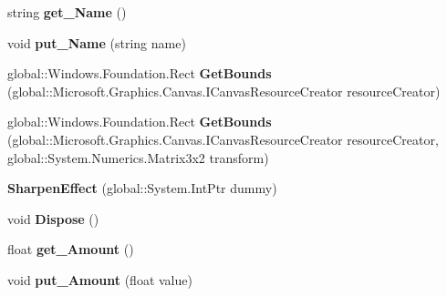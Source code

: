 \begin{DoxyCompactItemize}
string {\bfseries get\+\_\+\+Name} ()
\item 
\mbox{\label{class_microsoft_1_1_graphics_1_1_canvas_1_1_effects_1_1_sharpen_effect_a4cd2933eb68733eaaa81fa49f9170a5f}} 
void {\bfseries put\+\_\+\+Name} (string name)
\item 
\mbox{\label{class_microsoft_1_1_graphics_1_1_canvas_1_1_effects_1_1_sharpen_effect_a79a03d434e2e48956d003964879ce65c}} 
global\+::\+Windows.\+Foundation.\+Rect {\bfseries Get\+Bounds} (global\+::\+Microsoft.\+Graphics.\+Canvas.\+I\+Canvas\+Resource\+Creator resource\+Creator)
\item 
\mbox{\label{class_microsoft_1_1_graphics_1_1_canvas_1_1_effects_1_1_sharpen_effect_a54df6548305c2f7ddeba7230f7fff008}} 
global\+::\+Windows.\+Foundation.\+Rect {\bfseries Get\+Bounds} (global\+::\+Microsoft.\+Graphics.\+Canvas.\+I\+Canvas\+Resource\+Creator resource\+Creator, global\+::\+System.\+Numerics.\+Matrix3x2 transform)
\item 
\mbox{\label{class_microsoft_1_1_graphics_1_1_canvas_1_1_effects_1_1_sharpen_effect_aa2c447cd17b2262cd288cbd0ecd66538}} 
{\bfseries Sharpen\+Effect} (global\+::\+System.\+Int\+Ptr dummy)
\item 
\mbox{\label{class_microsoft_1_1_graphics_1_1_canvas_1_1_effects_1_1_sharpen_effect_ab80afd02393c881baccb9ee076f0e68a}} 
void {\bfseries Dispose} ()
\item 
\mbox{\label{class_microsoft_1_1_graphics_1_1_canvas_1_1_effects_1_1_sharpen_effect_aa474bc9966d9aebafd4d25b60af032b6}} 
float {\bfseries get\+\_\+\+Amount} ()
\item 
\mbox{\label{class_microsoft_1_1_graphics_1_1_canvas_1_1_effects_1_1_sharpen_effect_aeee519576168a556c0566065630c0937}} 
void {\bfseries put\+\_\+\+Amount} (float value)

\end{DoxyCompactItemize}
